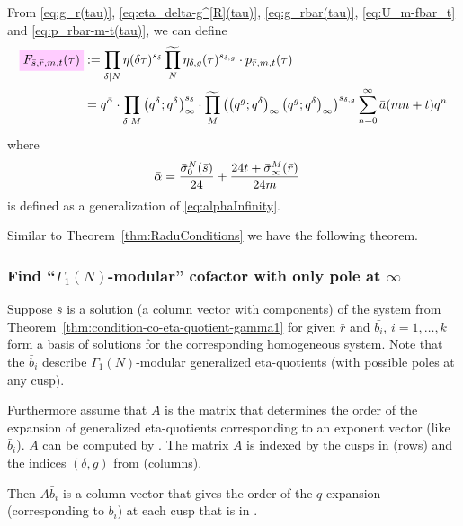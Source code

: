 \documentclass{article}
\begin{document}
From \eqref{eq:g_r(tau)}, \eqref{eq:eta_delta-g^[R](tau)},
\eqref{eq:g_rbar(tau)}, \eqref{eq:U_m-fbar_t} and
\eqref{eq:p_rbar-m-t(tau)}, we can define
\begin{align}
  \defineNotation[F-sbar-rbar-m-t]{F_{\bar{s}, \bar{r}, m, t}(\tau)}
  &:= \divisorprod{N} \eta(\delta\tau)^{s_{\delta}}
    \genprod[N] \eta_{\delta,g}(\tau)^{s_{\delta,g}}
    \cdot p_{\bar{r},m,t}(\tau)
  \notag\\
  &=
    q^{\bar{\alpha}}
    \cdot
    \divisorprod{M}
    \eulerFunction[q^\delta]{}^{s_\delta}
    \cdot
    \genprod[M]
    \left(
    \qPochhammer{q^g}{q^\delta} \qPochhammer{q^g}{q^\delta}
    \right)^{s_{\delta,g}}
    \sum_{n=0}^\infty \bar{a}(mn+t) q^n
    \label{eq:F_sbar-rbar-m-t(tau)}
\end{align}
where
\begin{align}
  \bar{\alpha}
  &=
    \frac{\sigmazerobar[N]{\bar{s}}}{24}
    +
    \frac{24t+\sigmainftybar[M]{\bar{r}}}{24m}
    \label{eq:alphabarInfinity}
\end{align}
is defined as a generalization of \eqref{eq:alphaInfinity}.

Similar to Theorem~\ref{thm:RaduConditions} we have the following
theorem.


\subsubsection{Find ``$\Gamma_1(N)$-modular'' cofactor with only pole
  at $\infty$}

Suppose $\bar{s}$ is a solution (a column vector with 
components) of the system from
Theorem~\ref{thm:condition-co-eta-quotient-gamma1} for given $\bar{r}$
and $\bar{b_i}$, $i=1,\ldots,k$ form a basis of solutions for the
corresponding homogeneous system. Note that the $\bar{b}_i$ describe
$\Gamma_1(N)$-modular generalized eta-quotients (with possible poles
at any cusp).

Furthermore assume that $A$ is the matrix that determines the order of
the expansion of generalized eta-quotients corresponding to an
exponent vector (like $\bar{b}_i$). $A$ can be computed by
. The matrix $A$ is indexed by
the cusps in  (rows) and the indices $(\delta,g)$ from
 (columns).

Then $A \bar{b}_i$ is a column vector that gives the order of the
$q$-expansion (corresponding to $\bar{b}_i$) at each cusp that is in
.
\end{document}
